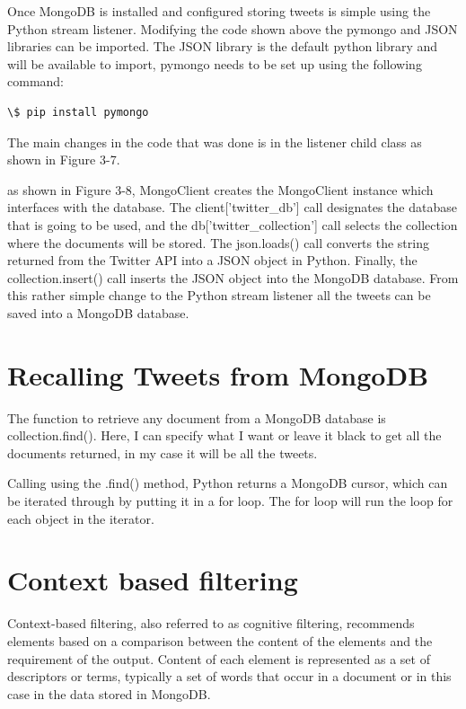 Once MongoDB is installed and configured storing tweets is simple using the Python stream listener. Modifying the code shown above the pymongo and JSON libraries can be imported. The JSON library is the default python library and will be available to import, pymongo needs to be set up using the following command:

\begin{lstlisting}
\$ pip install pymongo
\end{lstlisting}

The main changes in the code that was done is in the listener child class as shown in Figure 3-7.

as  shown in Figure 3-8, MongoClient creates the MongoClient instance which interfaces with the database. The client['twitter\_db'] call designates the database that is going to be used, and the db['twitter\_collection'] call selects the collection where the documents will be stored. The json.loads() call converts the string returned from the Twitter API into a JSON object in Python. Finally, the collection.insert() call inserts the JSON object into the MongoDB database. From this rather simple change to the Python stream listener all the tweets can be saved into a MongoDB database.

\section{Recalling Tweets from MongoDB}

The function to retrieve any document from a MongoDB database is collection.find(). Here, I can specify what I want or leave it black to get all the documents returned, in my case it will be all the tweets.

Calling using the .find() method, Python returns a MongoDB cursor, which can be iterated through by putting it in a for loop. The for loop will run the loop for each object in the iterator. 

\section{Context based filtering}

Context-based filtering, also referred to as cognitive filtering, recommends elements based on a comparison between the content of the elements and the requirement of the output. Content of each element is represented as a set of descriptors or terms, typically a set of words that occur in a document or in this case in the data stored in MongoDB.

